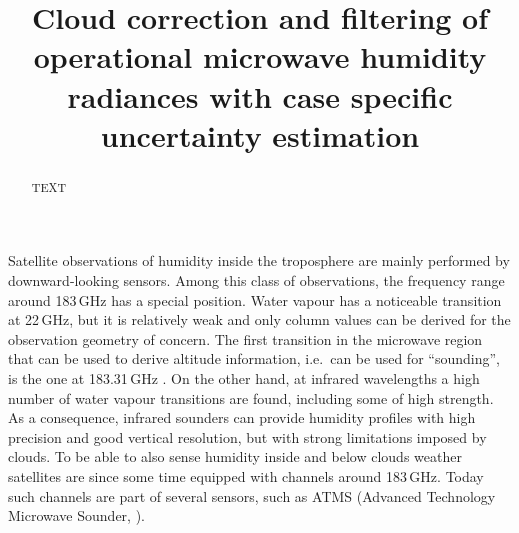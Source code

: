 \documentclass[amt, manuscript]{copernicus}
\begin{document}
\title{Cloud correction and filtering of operational microwave humidity
  radiances with case specific uncertainty estimation}










\maketitle


\begin{abstract}
TEXT
\end{abstract}




\introduction
%
Satellite observations of humidity inside the troposphere are mainly performed
by downward-looking sensors. Among this class of observations, the frequency
range around 183\,GHz has a special position. Water vapour has a noticeable
transition at 22\,GHz, but it is relatively weak and only column values can be
derived \citep[e.g.][]{schluessel1990atmospheric} for the observation geometry
of concern. The first transition in the microwave region that can be used to
derive altitude information, i.e.\ can be used for ``sounding'', is the one at
183.31\,GHz \citep{kakar1983retrieval,wang1983profiling}. On the other hand, at
infrared wavelengths a high number of water vapour transitions are found,
including some of high strength. As a consequence, infrared sounders can
provide humidity profiles with high precision and good vertical resolution, but
with strong limitations imposed by clouds. To be able to also sense humidity
inside and below clouds weather satellites are since some time equipped with
channels around 183\,GHz. Today such channels are part of several sensors, such
as ATMS (Advanced Technology Microwave Sounder, \citet{weng2012introduction}).
\end{document}
